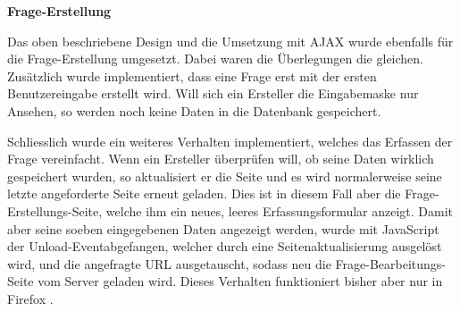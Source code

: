 \bigskip\bigskip

\textbf{Frage-Erstellung}

\bigskip

Das oben beschriebene Design und die Umsetzung mit AJAX wurde ebenfalls für die Frage-Erstellung umgesetzt. Dabei waren die Überlegungen die gleichen. \\

Zusätzlich wurde implementiert, dass eine Frage erst mit der ersten Benutzereingabe erstellt wird. Will sich ein Ersteller die Eingabemaske nur Ansehen, so werden noch keine Daten in die Datenbank gespeichert.

Schliesslich wurde ein weiteres Verhalten implementiert, welches das Erfassen der Frage vereinfacht. Wenn ein Ersteller überprüfen will, ob seine Daten wirklich gespeichert wurden, so aktualisiert er die Seite und es wird normalerweise seine letzte angeforderte Seite erneut geladen. Dies ist in diesem Fall aber die Frage-Erstellungs-Seite, welche ihm ein neues, leeres Erfassungsformular anzeigt. Damit aber seine soeben eingegebenen Daten angezeigt werden, wurde mit JavaScript der \glqq Unload-Event\grqq abgefangen, welcher durch eine Seitenaktualisierung ausgelöst wird, und die angefragte \gls{URL} ausgetauscht, sodass neu die Frage-Bearbeitungs-Seite vom Server geladen wird.
Dieses Verhalten funktioniert bisher aber nur in Firefox \cite{firefox}.








